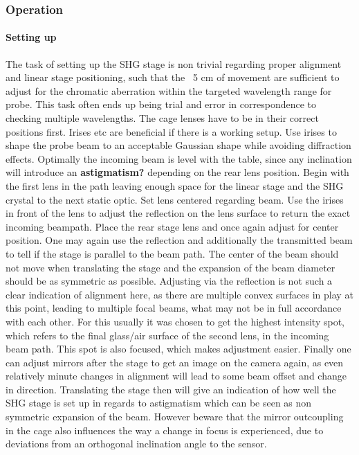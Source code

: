 \documentclass[twoside,openright]{scrreprt}
\begin{document}
\subsubsection{Operation}
\paragraph{Setting up}
The task of setting up the SHG stage is non trivial regarding proper alignment and linear stage positioning, such that the ~5 cm of movement are sufficient to adjust for the chromatic aberration within the targeted wavelength range for probe. This task often ends up being trial and error in correspondence to checking multiple wavelengths. The cage lenses have to be in their correct positions first.\newline
Irises etc are beneficial if there is a working setup.\newline
Use irises to shape the probe beam to an acceptable Gaussian shape while avoiding diffraction effects. Optimally the incoming beam is level with the table, since any inclination will introduce an \textbf{astigmatism?} depending on the rear lens position.\newline
Begin with the first lens in the path leaving enough space for the linear stage and the SHG crystal to the next static optic. Set lens centered regarding beam. Use the irises in front of the lens to adjust the reflection on the lens surface to return the exact incoming beampath.\newline
Place the rear stage lens and once again adjust for center position. One may again use the reflection and additionally the transmitted beam to tell if the stage is parallel to the beam path. The center of the beam should not move when translating the stage and the expansion of the beam diameter should be as symmetric as possible. Adjusting via the reflection is not such a clear indication of alignment here, as there are multiple convex surfaces in play at this point, leading to multiple focal beams, what may not be in full accordance with each other. For this usually it was chosen to get the highest intensity spot, which refers to the final glass/air surface of the second lens, in the incoming beam path. This spot is also focused, which makes adjustment easier.\newline
Finally one can adjust mirrors after the stage to get an image on the camera again, as even relatively minute changes in alignment will lead to some beam offset and change in direction. Translating the stage then will give an indication of how well the SHG stage is set up in regards to astigmatism which can be seen as non symmetric expansion of the beam. However beware that the mirror outcoupling in the cage also influences the way a change in focus is experienced, due to deviations from an orthogonal inclination angle to the sensor.
\end{document}
